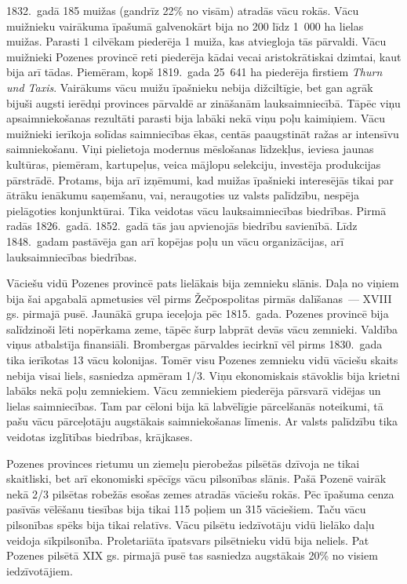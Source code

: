 \documentclass[twoside,a5paper,12pt,fleqn,openany]{extbook}
\newcommand{\detxti}[1]{\textit{\textgerman{#1}}}
\begin{document}
1832.~gadā 185 muižas (gandrīz 22\% no visām) atradās vācu rokās. Vācu muižnieku vairākuma īpašumā galvenokārt bija no 200 līdz 1~000 ha lielas muižas. Parasti 1 cilvēkam piederēja 1 muiža, kas atviegloja tās pārvaldi. Vācu muižnieki Pozenes provincē reti piederēja kādai vecai aristokrātiskai dzimtai, kaut bija arī tādas. Piemēram, kopš 1819.~gada 25~641 ha piederēja firstiem \detxti{Thurn und Taxis}. Vairākums vācu muižu īpašnieku nebija dižciltīgie, bet gan agrāk bijuši augsti ierēdņi provinces pārvaldē ar zināšanām lauksaimniecībā. Tāpēc viņu apsaimniekošanas rezultāti parasti bija labāki nekā viņu poļu kaimiņiem. Vācu muižnieki ierīkoja solīdas saimniecības ēkas, centās paaugstināt ražas ar intensīvu saimniekošanu. Viņi pielietoja modernus mēslošanas līdzekļus, ieviesa jaunas kultūras, piemēram, kartupeļus, veica mājlopu selekciju, investēja produkcijas pārstrādē. Protams, bija arī izņēmumi, kad muižas īpašnieki interesējās tikai par ātrāku ienākumu saņemšanu, vai, neraugoties uz valsts palīdzību, nespēja pielāgoties konjunktūrai. Tika veidotas vācu lauksaimniecības biedrības. Pirmā radās 1826.~gadā. 1852.~gadā tās jau apvienojās biedrību savienībā. Līdz 1848.~gadam pastāvēja gan arī kopējas poļu un vācu organizācijas, arī lauksaimniecības biedrības.

Vāciešu vidū Pozenes provincē pats lielākais bija zemnieku slānis. Daļa no viņiem bija šai apgabalā apmetusies vēl pirms Žečpospolitas pirmās dalīšanas~--- XVIII gs. pirmajā pusē. Jaunākā grupa ieceļoja pēc 1815.~gada. Pozenes provincē bija salīdzinoši lēti nopērkama zeme, tāpēc šurp labprāt devās vācu zemnieki. Valdība viņus atbalstīja finansiāli. Brombergas pārvaldes iecirknī vēl pirms 1830.~gada tika ierīkotas 13 vācu kolonijas. Tomēr visu Pozenes zemnieku vidū vāciešu skaits nebija visai liels, sasniedza apmēram 1/3. Viņu ekonomiskais stāvoklis bija krietni labāks nekā poļu zemniekiem. Vācu zemniekiem piederēja pārsvarā vidējas un lielas saimniecības. Tam par cēloni bija kā labvēlīgie pārcelšanās noteikumi, tā pašu vācu pārceļotāju augstākais saimniekošanas līmenis. Ar valsts palīdzību tika veidotas izglītības biedrības, krājkases.

Pozenes provinces rietumu un ziemeļu pierobežas pilsētās dzīvoja ne tikai skaitliski, bet arī ekonomiski spēcīgs vācu pilsonības slānis. Pašā Pozenē vairāk nekā 2/3 pilsētas robežās esošas zemes atradās vāciešu rokās. Pēc īpašuma cenza pasīvās vēlēšanu tiesības bija tikai 115 poļiem un 315 vāciešiem. Taču vācu pilsonības spēks bija tikai relatīvs. Vācu pilsētu iedzīvotāju vidū lielāko daļu veidoja sīkpilsonība. Proletariāta īpatsvars pilsētnieku vidū bija neliels. Pat Pozenes pilsētā XIX gs. pirmajā pusē tas sasniedza augstākais 20\% no visiem iedzīvotājiem.
\end{document}
